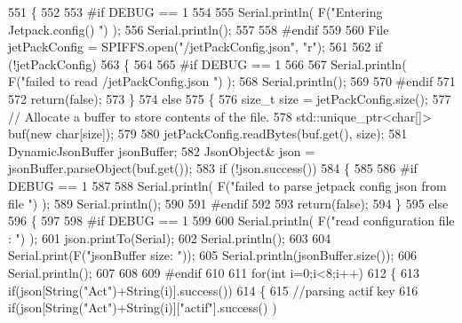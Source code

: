 \begin{DoxyCode}
551 \{
552 
553 \textcolor{preprocessor}{#if DEBUG == 1 }
554 
555     Serial.println( F(\textcolor{stringliteral}{"Entering Jetpack.config() "}) );
556     Serial.println();
557 
558 \textcolor{preprocessor}{#endif}
559 
560     File jetPackConfig = SPIFFS.open(\textcolor{stringliteral}{"/jetPackConfig.json"}, \textcolor{stringliteral}{"r"});
561 
562     \textcolor{keywordflow}{if} (!jetPackConfig) 
563     \{
564 
565 \textcolor{preprocessor}{    #if DEBUG == 1 }
566 
567         Serial.println( F(\textcolor{stringliteral}{"failed to read /jetPackConfig.json "}) );
568         Serial.println();
569 
570 \textcolor{preprocessor}{    #endif}
571 
572         \textcolor{keywordflow}{return}(\textcolor{keyword}{false});
573     \}
574     \textcolor{keywordflow}{else}
575     \{
576         \textcolor{keywordtype}{size\_t} size = jetPackConfig.size();
577         \textcolor{comment}{// Allocate a buffer to store contents of the file.}
578         std::unique\_ptr<char[]> buf(\textcolor{keyword}{new} \textcolor{keywordtype}{char}[size]);
579 
580         jetPackConfig.readBytes(buf.get(), size);
581         DynamicJsonBuffer jsonBuffer;
582         JsonObject& json = jsonBuffer.parseObject(buf.get());
583         \textcolor{keywordflow}{if} (!json.success()) 
584         \{
585         
586 \textcolor{preprocessor}{        #if DEBUG == 1 }
587 
588             Serial.println( F(\textcolor{stringliteral}{"failed to parse jetpack config json from file "}) );
589             Serial.println();
590 
591 \textcolor{preprocessor}{        #endif}
592 
593             \textcolor{keywordflow}{return}(\textcolor{keyword}{false});
594         \} 
595         \textcolor{keywordflow}{else}
596         \{ 
597         
598 \textcolor{preprocessor}{        #if DEBUG == 1 }
599 
600             Serial.println( F(\textcolor{stringliteral}{"read configuration file : "}) );
601             json.printTo(Serial);
602             Serial.println();
603 
604             Serial.print(F(\textcolor{stringliteral}{"jsonBuffer size: "}));
605             Serial.println(jsonBuffer.size());
606             Serial.println();
607 
608         
609 \textcolor{preprocessor}{        #endif}
610   
611             \textcolor{keywordflow}{for}(\textcolor{keywordtype}{int} i=0;i<8;i++)
612             \{   
613                 \textcolor{keywordflow}{if}(json[String(\textcolor{stringliteral}{"Act"})+String(i)].success())
614                 \{
615                     \textcolor{comment}{//parsing actif key}
616                     \textcolor{keywordflow}{if}(json[String(\textcolor{stringliteral}{"Act"})+String(i)][\textcolor{stringliteral}{"actif"}].success() )

\end{DoxyCode}
